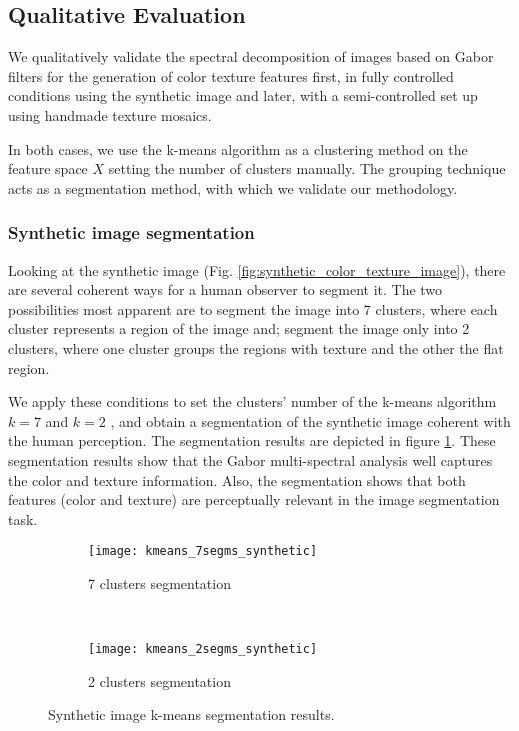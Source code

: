 \subsection{Qualitative Evaluation}
We qualitatively validate the spectral decomposition of images based on Gabor filters for the generation of color texture features first, in fully controlled conditions using the synthetic image and later, with a semi-controlled set up using handmade texture mosaics.

In both cases, we use the k-means algorithm as a clustering method on the feature space $X$ setting the number of clusters manually. The grouping technique acts as a segmentation method, with which we validate our methodology.

\subsubsection{Synthetic image segmentation}
Looking at the synthetic image (Fig. \ref{fig:synthetic_color_texture_image}),  there are several coherent ways for a human observer to segment it. The two possibilities most apparent are to segment the image into 7 clusters, where each cluster represents a region of the image and; segment the image only into 2 clusters, where one cluster groups the regions with texture and the other the flat region. 

We apply these conditions to set the clusters' number of the k-means algorithm $k = 7$ and $k = 2$ ,  and obtain a segmentation of the synthetic image coherent with the human perception. The segmentation results are depicted in figure  \ref{fig:kmeans_segms_synthetic_img}. These segmentation results show that the Gabor multi-spectral analysis well captures the color and texture information. Also, the segmentation shows that both features (color and texture) are perceptually relevant in the image segmentation task.  

\begin{figure}[!ht]
    \centering
    \begin{subfigure}[b]{\textwidth}
        \texttt{[image: kmeans\_7segms\_synthetic]}
        \caption{7 clusters segmentation}
    \end{subfigure} \\    
    \begin{subfigure}[b]{\textwidth}
    	\texttt{[image: kmeans\_2segms\_synthetic]}
        \caption{2 clusters segmentation}
    \end{subfigure} 
        	    
    \caption{Synthetic image k-means segmentation results.}\label{fig:kmeans_segms_synthetic_img}    
\end{figure}


